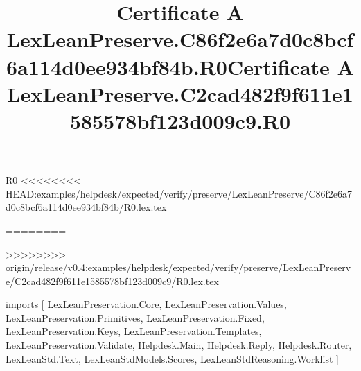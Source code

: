 \begin{lexlean}{R0}
<<<<<<<< HEAD:examples/helpdesk/expected/verify/preserve/LexLeanPreserve/C86f2e6a7d0c8bcf6a114d0ee934bf84b/R0.lex.tex
\title{Certificate A LexLeanPreserve.C86f2e6a7d0c8bcf6a114d0ee934bf84b.R0}
========
\title{Certificate A LexLeanPreserve.C2cad482f9f611e1585578bf123d009c9.R0}
>>>>>>>> origin/release/v0.4:examples/helpdesk/expected/verify/preserve/LexLeanPreserve/C2cad482f9f611e1585578bf123d009c9/R0.lex.tex
\begin{coremodule}
imports [
  LexLeanPreservation.Core,
  LexLeanPreservation.Values,
  LexLeanPreservation.Primitives,
  LexLeanPreservation.Fixed,
  LexLeanPreservation.Keys,
  LexLeanPreservation.Templates,
  LexLeanPreservation.Validate,
  Helpdesk.Main,
  Helpdesk.Reply,
  Helpdesk.Router,
  LexLeanStd.Text,
  LexLeanStdModels.Scores,
  LexLeanStdReasoning.Worklist
]


\end{coremodule}
\end{lexlean}
